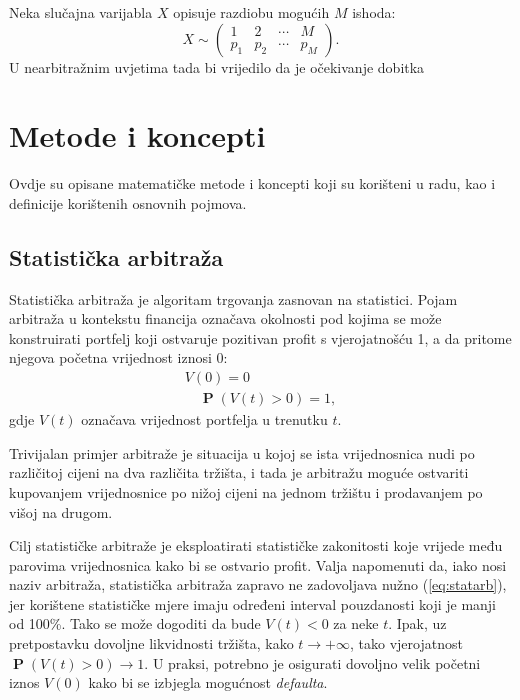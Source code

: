 \documentclass[lmodern, utf8, diplomski, numeric]{fer}
\newcommand{\prob}[1]{\operatorname{\mathbf{P}}\q(#1\w)}
\newcommand{\q}{\left}
\newcommand{\w}{\right}
\begin{document}
  Neka slučajna varijabla $X$ opisuje razdiobu mogućih $M$ ishoda:
  \begin{equation*}
    X \sim \begin{pmatrix} 1 & 2 & \cdots & M \\ p_1 & p_2 & \cdots & p_M \end{pmatrix}.
  \end{equation*}
  U nearbitražnim uvjetima tada bi vrijedilo da je očekivanje dobitka 


  \chapter{Metode i koncepti}
  Ovdje su opisane matematičke metode i koncepti koji su korišteni u radu, kao i definicije korištenih osnovnih pojmova.
  
  \section{Statistička arbitraža}
  Statistička arbitraža  je algoritam trgovanja zasnovan na statistici.
  Pojam arbitraža u kontekstu financija označava okolnosti pod kojima se može konstruirati portfelj koji ostvaruje pozitivan profit s vjerojatnošću 1, a da pritome njegova početna vrijednost iznosi 0:
  \begin{equation}
  \begin{gathered}
  \label{eq:statarb}
  V\q(0\w) = 0\\
  \quad \prob{V\q(t\w) > 0} = 1,
  \end{gathered}
  \end{equation}
  gdje $V\q(t\w)$ označava vrijednost portfelja u trenutku $t$.
  
  Trivijalan primjer arbitraže je situacija u kojoj se ista vrijednosnica nudi po različitoj cijeni na dva različita tržišta, i tada je arbitražu moguće ostvariti kupovanjem vrijednosnice po nižoj cijeni na jednom tržištu i prodavanjem po višoj na drugom.
  
  Cilj statističke arbitraže je eksploatirati statističke zakonitosti koje vrijede među parovima vrijednosnica kako bi se ostvario profit.  
  Valja napomenuti da, iako nosi naziv arbitraža, statistička arbitraža zapravo ne zadovoljava nužno (\ref{eq:statarb}), jer korištene statističke mjere imaju određeni interval pouzdanosti koji je manji od 100\%.
  Tako se može dogoditi da bude $V\q(t\w) < 0$ za neke $t$.
  Ipak, uz pretpostavku dovoljne likvidnosti tržišta, kako $t \to +\infty$, tako vjerojatnost $\prob{V\q(t\w) > 0} \to 1$.
  U praksi, potrebno je osigurati dovoljno velik početni iznos $V(0)$ kako bi se izbjegla mogućnost \textit{defaulta}.
  
\end{document}
